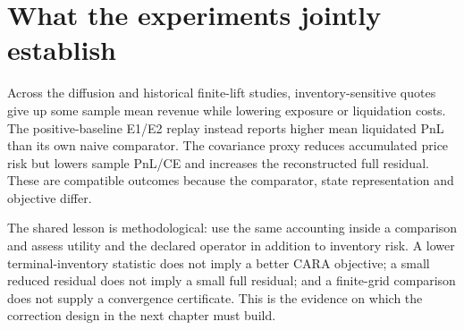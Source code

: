 \section{What the experiments jointly establish}
Across the diffusion and historical finite-lift studies, inventory-sensitive quotes give up some sample mean revenue while lowering exposure or liquidation costs. The positive-baseline E1/E2 replay instead reports higher mean liquidated PnL than its own naive comparator. The covariance proxy reduces accumulated price risk but lowers sample PnL/CE and increases the reconstructed full residual. These are compatible outcomes because the comparator, state representation and objective differ.

The shared lesson is methodological: use the same accounting inside a comparison and assess utility and the declared operator in addition to inventory risk. A lower terminal-inventory statistic does not imply a better CARA objective; a small reduced residual does not imply a small full residual; and a finite-grid comparison does not supply a convergence certificate. This is the evidence on which the correction design in the next chapter must build.
